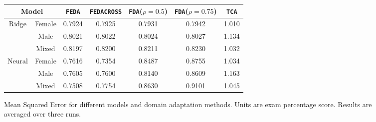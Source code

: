 \documentclass{article}
\begin{document}
\begin{figure}[h]
\label{baselines}
\centering{}
\begin{center}
\begin{tabular}{ |c|c||c|c|c|c|c| }
 \hline
 \multicolumn{2}{|c|}{Model} & \texttt{FEDA} & \texttt{FEDACROSS} & \texttt{FDA}(\(\rho=0.5\)) & \texttt{FDA}(\(\rho=0.75\)) & \texttt{TCA} \\ 
 \hline
 \hline
 \multirow{3}{*}{Ridge} & Female & 0.7924 & 0.7925 & 0.7931 & 0.7942 & 1.010  \\  
 \cline{2-7}
       & Male                    & 0.8021 & 0.8022 & 0.8024 & 0.8027 & 1.134 \\
 \cline{2-7}
       & Mixed                    & 0.8197 & 0.8200 & 0.8211 & 0.8230 & 1.032 \\
 \hline
 \multirow{3}{*}{Neural} & Female & 0.7616 & 0.7354 & 0.8487 & 0.8755 & 1.034 \\
 \cline{2-7}
       & Male & 0.7605 & 0.7600 & 0.8140 & 0.8609 & 1.163\\
 \cline{2-7}
       & Mixed & 0.7508 & 0.7754 & 0.8630 & 0.9101 & 1.045 \\
 \hline
\end{tabular}
\end{center}
\caption{Mean Squared Error for different models and domain adaptation methods. Units are exam percentage score. Results are averaged over three runs.}
\end{figure}

\medskip

\small



\end{document}
